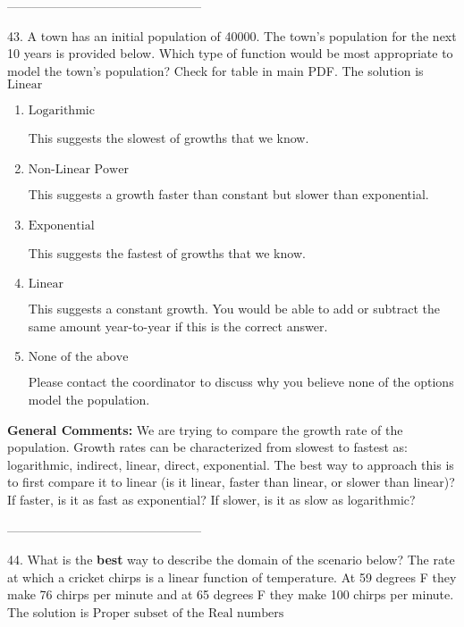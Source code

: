 \documentclass{extbook}[14pt]
\begin{document}
-----------------------------------------------

43. A town has an initial population of 40000. The town's population for the next 10 years is provided below. Which type of function would be most appropriate to model the town's population?
Check for table in main PDF. 
The solution is $ \text{Linear} $ 

\begin{enumerate}[label=\Alph*.] 
\item $ \text{Logarithmic} $ 

 This suggests the slowest of growths that we know. 
\item $ \text{Non-Linear Power} $ 

 This suggests a growth faster than constant but slower than exponential. 
\item $ \text{Exponential} $ 

 This suggests the fastest of growths that we know. 
\item $ \text{Linear} $ 

 This suggests a constant growth. You would be able to add or subtract the same amount year-to-year if this is the correct answer. 
\item $ \text{None of the above} $ 

 Please contact the coordinator to discuss why you believe none of the options model the population. 
\end{enumerate} 
 
\textbf{General Comments:} We are trying to compare the growth rate of the population. Growth rates can be characterized from slowest to fastest as: logarithmic, indirect, linear, direct, exponential. The best way to approach this is to first compare it to linear (is it linear, faster than linear, or slower than linear)? If faster, is it as fast as exponential? If slower, is it as slow as logarithmic?

-----------------------------------------------

44. What is the \textbf{best} way to describe the domain of the scenario below?
The rate at which a cricket chirps is a linear function of temperature. At 59 degrees F they make 76 chirps per minute and at 65 degrees F they make 100 chirps per minute. 
The solution is $ \text{Proper subset of the Real numbers} $ 
\end{document}
